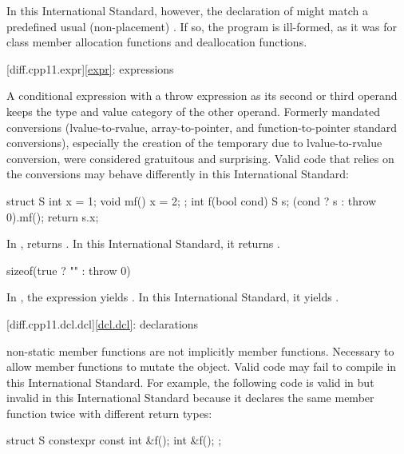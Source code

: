 In this International Standard, however, the declaration of 
might match a predefined usual (non-placement)
. If so, the
program is ill-formed, as it was for class member allocation functions and
deallocation functions.

[diff.cpp11.expr]{\ref{expr}: expressions}

\change A conditional expression with a throw expression as its second or third
operand keeps the type and value category of the other operand.
\rationale Formerly mandated conversions (lvalue-to-rvalue,
array-to-pointer, and function-to-pointer
standard conversions), especially the creation of the temporary due to
lvalue-to-rvalue conversion, were considered gratuitous and surprising.
\effect Valid \CppXI{} code that relies on the conversions may behave differently
in this International Standard:

\begin{codeblock}
struct S {
  int x = 1;
  void mf() { x = 2; }
};
int f(bool cond) {
  S s;
  (cond ? s : throw 0).mf();
  return s.x;
}
\end{codeblock}

In \CppXI{},  returns . In this International Standard,
it returns .

\begin{codeblock}
sizeof(true ? "" : throw 0)
\end{codeblock}

In \CppXI{}, the expression yields . In this
International Standard, it yields .

[diff.cpp11.dcl.dcl]{\ref{dcl.dcl}: declarations}

\change {} non-static member functions are not implicitly
 member functions.
\rationale Necessary to allow  member functions to mutate
the object.
\effect
Valid \CppXI{} code may fail to compile in this International Standard.
For example, the following code is valid in \CppXI{}
but invalid in this International Standard because it declares the same member
function twice with different return types:

\begin{codeblock}
struct S {
  constexpr const int &f();
  int &f();
};
\end{codeblock}

